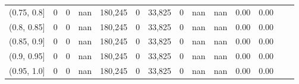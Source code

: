 \begin{tabular}{rrrrrrrrrrrrrr}
(0.75, 0.8]    &        0 &       0 &   nan &  180,245 &        0 &  33,825 &       0 &   nan &   nan &  0.00 &      0.00 \\
(0.8, 0.85]    &        0 &       0 &   nan &  180,245 &        0 &  33,825 &       0 &   nan &   nan &  0.00 &      0.00 \\
(0.85, 0.9]    &        0 &       0 &   nan &  180,245 &        0 &  33,825 &       0 &   nan &   nan &  0.00 &      0.00 \\
(0.9, 0.95]    &        0 &       0 &   nan &  180,245 &        0 &  33,825 &       0 &   nan &   nan &  0.00 &      0.00 \\
(0.95, 1.0]    &        0 &       0 &   nan &  180,245 &        0 &  33,825 &       0 &   nan &   nan &  0.00 &      0.00 \\
\bottomrule
\end{tabular}
